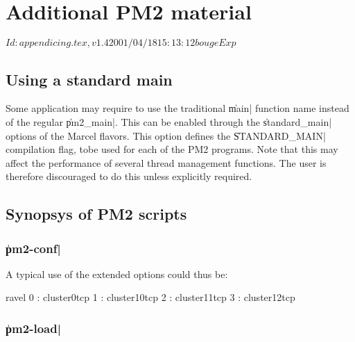 \chapter{Additional PM2 material}

\stamp $Id: appendicing.tex,v 1.4 2001/04/18 15:13:12 bouge Exp $

\section{Using a standard main}
\label{sec:tradimain}

Some application may require to use the traditional \|main| function
name instead of the regular \|pm2_main|. This can be enabled through
the \|standard_main| options of the Marcel flavors. This option
defines the \|STANDARD_MAIN| compilation flag, tobe used for each of
the PM2 programs. Note that this may affect the performance of several
thread management functions. The user is therefore discouraged to do
this unless explicitly required.

\section{Synopsys of PM2 scripts}
\label{sec:scripts}

\subsection{\|pm2-conf|}


A typical use of the extended options could thus be:
\begin{shell}
ravel%
0 : cluster0tcp
1 : cluster10tcp
2 : cluster11tcp
3 : cluster12tcp
\end{shell}

\subsection{\|pm2-load|}

